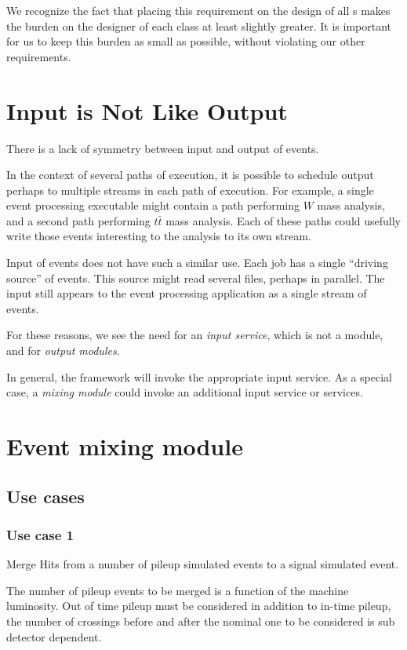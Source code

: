 \documentclass[draftmode]{memarticle}
\newcommand{\EDProduct}{\classname{ED\-Product}}
\begin{document}
We recognize the fact that placing this requirement
on the design of all \EDProduct{}s
makes the burden on the designer of each \EDProduct class
at least slightly greater.
It is important for us to keep this burden as small as possible,
without violating our other requirements.

\section{Input is Not Like Output}\label{s:inputandoutput}

There is a lack of symmetry between input and output of events.

In the context of several paths of execution,
it is possible to schedule output
perhaps to multiple streams
in each path of execution.
For example,
a single event processing executable
might contain a path performing $W$ mass analysis,
and a second path performing $t\bar{t}$ mass analysis.
Each of these paths could usefully write those events interesting to the analysis
to its own stream.

Input of events does not have such a similar use.
Each job has a single ``driving source'' of events.
This source might read several files,
perhaps in parallel.
The input still appears to the event processing application
as a single stream of events.

For these reasons,
we see the need for an \emph{input service},
which is not a module,
and for \emph{output modules}.

In general,
the framework will invoke the appropriate input service.
As a special case,
a \emph{mixing module} could invoke
an additional input service or services.

\section{Event mixing module}
\subsection{ Use cases }

\subsubsection { Use case 1}

Merge Hits from a number of pileup simulated events to a signal simulated event.

The number of pileup events to be merged is a function of the machine luminosity.
Out of time pileup must be considered in addition to in-time pileup, the number of crossings before and after the nominal one to be considered is sub detector dependent.
\end{document}

